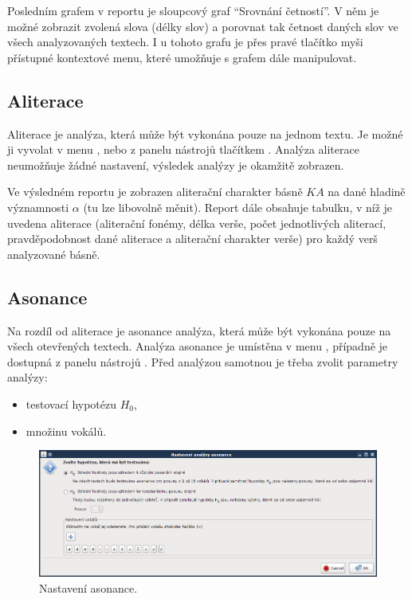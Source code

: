 \documentclass[dp.tex]{subfiles}
\begin{document}
Posledním grafem v reportu je sloupcový graf \enquote{Srovnání četností}. V něm je možné zobrazit zvolená slova (délky slov) a porovnat tak četnost daných slov ve všech analyzovaných textech. I u tohoto grafu je přes pravé tlačítko myši přístupné kontextové menu, které umožňuje s grafem dále manipulovat.

\subsection{Aliterace}

Aliterace je analýza, která může být vykonána pouze na jednom textu. Je možné ji vyvolat v menu , nebo z panelu nástrojů tlačítkem . Analýza aliterace neumožňuje žádné nastavení, výsledek analýzy je okamžitě zobrazen. 

Ve výsledném reportu je zobrazen aliterační charakter básně $\mathit{KA}$ na dané hladině významnosti $\alpha$ (tu lze libovolně měnit). Report dále obsahuje tabulku, v níž je uvedena aliterace (aliterační fonémy, délka verše, počet jednotlivých aliterací, pravděpodobnost dané aliterace a aliterační charakter verše) pro každý verš analyzované básně.
	
\subsection{Asonance}
\label{chap:app_asonance}
Na rozdíl od aliterace je asonance analýza, která může být vykonána pouze na všech otevřených textech. Analýza asonance je umístěna v menu , případně je dostupná z panelu nástrojů . Před analýzou samotnou je třeba zvolit parametry analýzy:
\begin{itemize}
\item testovací hypotézu $H_0$,
\item množinu vokálů.
\end{itemize}

\begin{figure}[H]
\centering
\includegraphics[max width=\textwidth,keepaspectratio=true]{imgs-60-aplikace/gui-asonance-settings}
\caption{Nastavení asonance.}
\label{fig:gui-asonance-settings}
\end{figure}
\end{document}
